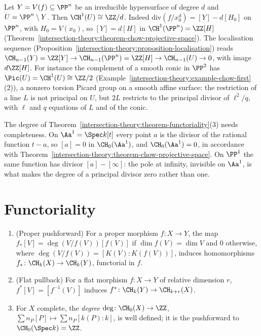 \begin{example}\label{intersection-theory:example-hypersurface-complement}
Let $Y = V(f) \subseteq \PP^n$ be an irreducible hypersurface of degree $d$ and $U = \PP^n \setminus Y$. Then $\CH^1(U) \cong \ZZ/d$. Indeed $\mathrm{div}(f/x_0^d) = [Y] - d[H_0]$ on $\PP^n$, with $H_0 = V(x_0)$, so
$[Y] = d[H]$ in $\CH^1(\PP^n) = \ZZ[H]$ (Theorem~\ref{intersection-theory:theorem-chow-projective-space}). The localisation sequence (Proposition~\ref{intersection-theory:proposition-localisation}) reads
$\CH_{n-1}(Y) = \ZZ[Y] \to \CH_{n-1}(\PP^n) = \ZZ[H] \to \CH_{n-1}(U) \to 0$, with image $d\ZZ[H]$. For instance the complement of a smooth conic in $\PP^2$ has $\Pic(U) = \CH^1(U) \cong \ZZ/2$
(Example~\ref{intersection-theory:example-chow-first}(2)), a nonzero torsion Picard group on a smooth affine surface: the restriction of a line $L$ is not principal on $U$, but $2L$ restricts to the principal
divisor of $\ell^2/q$, with $\ell$ and $q$ equations of $L$ and of the conic.
\end{example}

\begin{counterexample}\label{intersection-theory:counterexample-degree-affine}
The degree of Theorem~\ref{intersection-theory:theorem-functoriality}(3) needs completeness. On $\Aa^1 = \Spec k[t]$ every point $a$ is the divisor of the rational function $t - a$, so $[a] = 0$ in $\CH_0(\Aa^1)$, and
$\CH_0(\Aa^1) = 0$, in accordance with Theorem~\ref{intersection-theory:theorem-chow-projective-space}. On $\PP^1$ the same function has divisor $[a] - [\infty]$: the pole at infinity, invisible on $\Aa^1$, is what
makes the degree of a principal divisor zero rather than one.
\end{counterexample}

\section{Functoriality}\label{intersection-theory:section-functoriality}

\begin{theorem}\label{intersection-theory:theorem-functoriality}
\begin{enumerate}
\item (Proper pushforward) For a proper morphism $f \colon X \to Y$, the map $f_*[V] = \deg(V/f(V))[f(V)]$ if $\dim f(V) = \dim V$ and $0$ otherwise, where
$\deg(V/f(V)) = [K(V) : K(f(V))]$, induces homomorphisms $f_* \colon \CH_k(X) \to \CH_k(Y)$, functorial in $f$.
\item (Flat pullback) For a flat morphism $f \colon X \to Y$ of relative dimension $r$, $f^*[V] = [f^{-1}(V)]$ induces $f^* \colon \CH_k(Y) \to \CH_{k+r}(X)$.
\item For $X$ complete, the \emph{degree} $\deg \colon \CH_0(X) \to \ZZ$, $\sum n_P[P] \mapsto \sum n_P[k(P) : k]$, is well defined; it is the pushforward to $\CH_0(\Spec k) = \ZZ$.
\end{enumerate}
\end{theorem}

